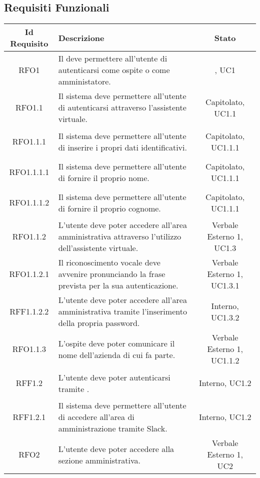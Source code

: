 \subsection{Requisiti Funzionali}
\normalsize
\begin{longtable}{|c|>{\centering}m{7cm}|c|}
	\hline
	\textbf{Id Requisito} & \textbf{Descrizione} & \textbf{Stato}\\
	\hline
	\endhead\hypertarget{RFO1}{RFO1} & Il \gl{sistema} deve permettere all'utente di autenticarsi come ospite o come amministatore. & \gl{Capitolato}, UC1\\ \hline
	\hypertarget{RFO1.1}{RFO1.1} & Il sistema deve permettere all'utente di autenticarsi attraverso l'assistente virtuale. & Capitolato, UC1.1\\ \hline
	\hypertarget{RFO1.1.1}{RFO1.1.1} & Il sistema deve permettere all'utente di inserire i propri dati identificativi. & Capitolato, UC1.1.1\\ \hline
	\hypertarget{RFO1.1.1.1}{RFO1.1.1.1} & Il sistema deve permettere all'utente di fornire il proprio nome. & Capitolato, UC1.1.1\\ \hline
	\hypertarget{RFO1.1.1.2}{RFO1.1.1.2} & Il sistema deve permettere all'utente di fornire il proprio cognome. & Capitolato, UC1.1.1\\ \hline
	\hypertarget{RFO1.1.2}{RFO1.1.2} & L'utente deve poter accedere all'area amministrativa attraverso l'utilizzo dell'assistente virtuale. & Verbale Esterno 1, UC1.3\\ \hline
	\hypertarget{RFO1.1.2.1}{RFO1.1.2.1} & Il riconoscimento vocale deve avvenire pronunciando la frase prevista per la sua autenticazione. & Verbale Esterno 1, UC1.3.1\\ \hline
	\hypertarget{RFF1.1.2.2}{RFF1.1.2.2} & L'utente deve poter accedere all'area amministrativa tramite l'inserimento della propria password. & Interno, UC1.3.2\\ \hline
	\hypertarget{RFO1.1.3}{RFO1.1.3} & L'ospite deve poter comunicare il nome dell'azienda di cui fa parte. & Verbale Esterno 1, UC1.1.2\\ \hline
	\hypertarget{RFF1.2}{RFF1.2} & L'utente deve poter autenticarsi tramite \gl{Slack}. & Interno, UC1.2\\ \hline
	\hypertarget{RFF1.2.1}{RFF1.2.1} & Il sistema deve permettere all'utente di accedere all'area di amministrazione tramite Slack. & Interno, UC1.2\\ \hline
	\hypertarget{RFO2}{RFO2} & L'utente deve poter accedere alla sezione amministrativa. & Verbale Esterno 1, UC2\\ \hline

\end{longtable}
